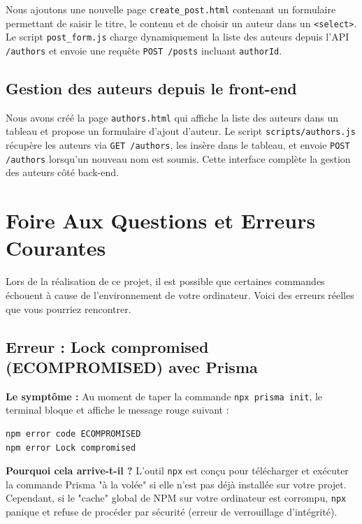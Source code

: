 Nous ajoutons une nouvelle page \texttt{create\_post.html} contenant un formulaire permettant de saisir le titre, le contenu et de choisir un auteur dans un \texttt{<select>}. Le script \texttt{post\_form.js} charge dynamiquement la liste des auteurs depuis l'API \texttt{/authors} et envoie une requête \texttt{POST /posts} incluant \texttt{authorId}.

\subsection{Gestion des auteurs depuis le front-end}
Nous avons créé la page \texttt{authors.html} qui affiche la liste des auteurs dans un tableau et propose un formulaire d’ajout d’auteur. Le script \texttt{scripts/authors.js} récupère les auteurs via \texttt{GET /authors}, les insère dans le tableau, et envoie \texttt{POST /authors} lorsqu’un nouveau nom est soumis. Cette interface complète la gestion des auteurs côté back-end.

\newpage

\section{Foire Aux Questions et Erreurs Courantes}

Lors de la réalisation de ce projet, il est possible que certaines commandes échouent à cause de l'environnement de votre ordinateur. Voici des erreurs réelles que vous pourriez rencontrer.

\subsection{Erreur : Lock compromised (ECOMPROMISED) avec Prisma}
\textbf{Le symptôme :} Au moment de taper la commande \texttt{npx prisma init}, le terminal bloque et affiche le message rouge suivant :
\begin{lstlisting}[language=bash]
npm error code ECOMPROMISED
npm error Lock compromised
\end{lstlisting}

\textbf{Pourquoi cela arrive-t-il ?}
L'outil \texttt{npx} est conçu pour télécharger et exécuter la commande Prisma "à la volée" si elle n'est pas déjà installée sur votre projet. Cependant, si le "cache" global de NPM sur votre ordinateur est corrompu, \texttt{npx} panique et refuse de procéder par sécurité (erreur de verrouillage d'intégrité).

